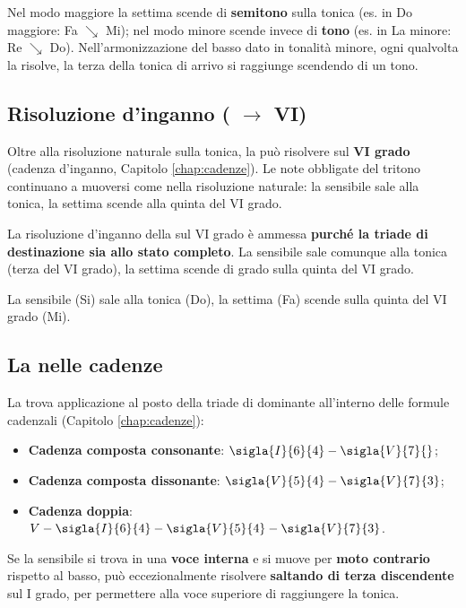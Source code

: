 \begin{osservazione}
	Nel modo maggiore la settima scende di \textbf{semitono} sulla tonica (es. in Do maggiore: Fa $\searrow$ Mi); nel modo minore scende invece di \textbf{tono} (es. in La minore: Re $\searrow$ Do). Nell'armonizzazione del basso dato in tonalità minore, ogni qualvolta la  risolve, la terza della tonica di arrivo si raggiunge scendendo di un tono.
\end{osservazione}

\subsection{Risoluzione d'inganno ( $\rightarrow$ VI)}
\label{sec:v7_inganno}

Oltre alla risoluzione naturale sulla tonica, la  può risolvere sul \textbf{VI grado} (cadenza d'inganno, Capitolo \ref{chap:cadenze}). Le note obbligate del tritono continuano a muoversi come nella risoluzione naturale: la sensibile sale alla tonica, la settima scende alla quinta del VI grado.

\begin{regola}
	\label{reg:v7_inganno}
	La risoluzione d'inganno della  sul VI grado è ammessa \textbf{purché la triade di destinazione sia allo stato completo}. La sensibile sale comunque alla tonica (terza del VI grado), la settima scende di grado sulla quinta del VI grado.
\end{regola}

\begin{esempio}
	\label{ex:v7_inganno}
	La sensibile (Si) sale alla tonica (Do), la settima (Fa) scende sulla quinta del VI grado (Mi).
\end{esempio}

\subsection{La  nelle cadenze}
\label{sec:v7_cadenze}

La  trova applicazione al posto della triade di dominante all'interno delle formule cadenzali (Capitolo \ref{chap:cadenze}):

\begin{itemize}
	\item \textbf{Cadenza composta consonante}: $\sigla{I}{6}{4} - \sigla{V}{7}{}$;
	\item \textbf{Cadenza composta dissonante}: $\sigla{V}{5}{4} - \sigla{V}{7}{3}$;
	\item \textbf{Cadenza doppia}: $V - \sigla{I}{6}{4} - \sigla{V}{5}{4} - \sigla{V}{7}{3}$.
\end{itemize}

\begin{osservazione}
	\label{oss:eccezione_bach}
	Se la sensibile si trova in una \textbf{voce interna} e si muove per \textbf{moto contrario} rispetto al basso, può eccezionalmente risolvere \textbf{saltando di terza discendente} sul I grado, per permettere alla voce superiore di raggiungere la tonica.
\end{osservazione}
